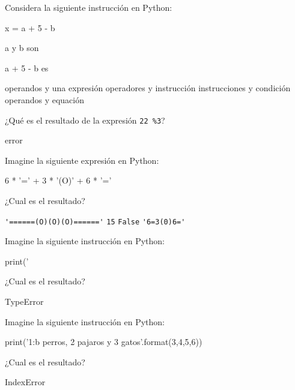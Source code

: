 \begin{ejercicio}Considera la siguiente instrucción en Python:

\begin{python}
x = a + 5 - b
\end{python}

a y b son 


a + 5 - b es 

\begin{choices}
    \choice operandos y una expresión %
    \choice operadores y instrucción
    \choice instrucciones y condición
    \choice operandos y equación
\end{choices}
\end{ejercicio}
\begin{ejercicio}¿Qué es el resultado de la expresión \texttt{22\ \%3}?

\begin{choices}
    \choice error
\end{choices}
\end{ejercicio}
\begin{ejercicio}Imagine la siguiente expresión en Python:

\begin{python}
6 * '=' + 3 * '(O)' + 6 * '='
\end{python}

¿Cual es el resultado?


\begin{choices}
    \choice \verb|'======(O)(O)(O)======'| %
    \choice \verb|15|
    \choice \verb|False|
    \choice \verb|'6=3(0)6='|
\end{choices}
\end{ejercicio}
\begin{ejercicio}Imagine la siguiente instrucción en Python:

\begin{python}
print('%
\end{python}

¿Cual es el resultado?

\begin{choices}
    \choice TypeError %
    \choice {}
    \choice {}
    \choice {}
\end{choices}
\end{ejercicio}
\begin{ejercicio}Imagine la siguiente instrucción en Python:

\begin{python}
print('{1:b} perros, {2} pajaros y {3} gatos'.format(3,4,5,6))
\end{python}

¿Cual es el resultado?


\begin{choices}
     \choice   {} %
    \choice {}
    \choice {}
    \choice IndexError
\end{choices}
\end{ejercicio}
